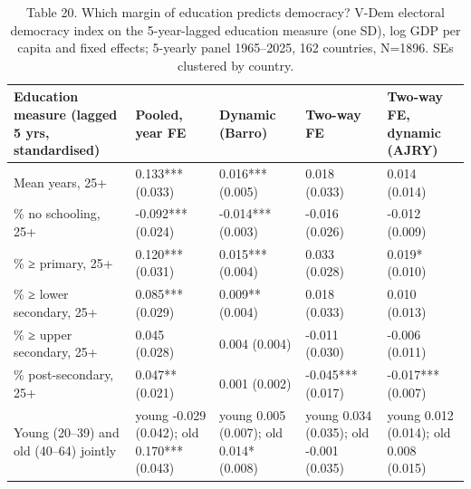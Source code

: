 \begin{table}
\caption{Table 20. Which margin of education predicts democracy? V-Dem electoral democracy index on the 5-year-lagged education measure (one SD), log GDP per capita and fixed effects; 5-yearly panel 1965–2025, 162 countries, N=1896. SEs clustered by country.}
\label{tab:T20_which_margin}
\begin{tabular}{lllll}
\toprule
Education measure (lagged 5 yrs, standardised) & Pooled, year FE & Dynamic (Barro) & Two-way FE & Two-way FE, dynamic (AJRY) \\
\midrule
Mean years, 25+ & 0.133*** (0.033) & 0.016*** (0.005) & 0.018 (0.033) & 0.014 (0.014) \\
\% no schooling, 25+ & -0.092*** (0.024) & -0.014*** (0.003) & -0.016 (0.026) & -0.012 (0.009) \\
\% ≥ primary, 25+ & 0.120*** (0.031) & 0.015*** (0.004) & 0.033 (0.028) & 0.019* (0.010) \\
\% ≥ lower secondary, 25+ & 0.085*** (0.029) & 0.009** (0.004) & 0.018 (0.033) & 0.010 (0.013) \\
\% ≥ upper secondary, 25+ & 0.045 (0.028) & 0.004 (0.004) & -0.011 (0.030) & -0.006 (0.011) \\
\% post-secondary, 25+ & 0.047** (0.021) & 0.001 (0.002) & -0.045*** (0.017) & -0.017*** (0.007) \\
Young (20–39) and old (40–64) jointly & young -0.029 (0.042); old 0.170*** (0.043) & young 0.005 (0.007); old 0.014* (0.008) & young 0.034 (0.035); old -0.001 (0.035) & young 0.012 (0.014); old 0.008 (0.015) \\
\bottomrule
\end{tabular}
\end{table}
